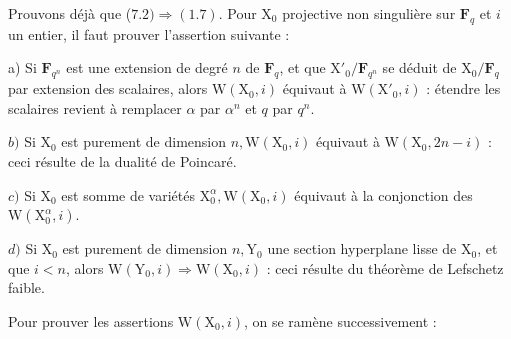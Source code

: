 \documentclass[10pt,leqno]{article}
\begin{document}
\clearpage

\endgroup

\label{physical-30}\par\smallskip

\noindent Prouvons déjà que (\(7.2)\Rightarrow (1.7)\). Pour \(\mathrm{X}_{0}\) projective non singulière sur \(\mathbf{F}_{q}\) et \(i\) un entier, il faut prouver l’assertion suivante :\par

\par

\noindent a) Si \(\mathbf{F}_{q^{n}}\) est une extension de degré \(n\) de \(\mathbf{F}_{q}\), et que \(\mathrm{X}'_{0}/\mathbf{F}_{q^{n}}\) se déduit de \(\mathrm{X}_{0}/\mathbf{F}_{q}\) par extension des scalaires, alors \(\mathrm{W}(\mathrm{X}_{0},i)\) équivaut à \(\mathrm{W}(\mathrm{X}'_{0},i)\) : étendre les scalaires revient à remplacer \(\alpha \) par \(\alpha ^{n}\) et \(q\) par \(q^{n}\).\par

\noindent \(b)\) Si \(\mathrm{X}_{0}\) est purement de dimension \(n, \mathrm{W}(\mathrm{X}_{0},i)\) équivaut à \(\mathrm{W}(\mathrm{X}_{0},2n- i)\) : ceci résulte de la dualité de Poincaré.\par

\noindent \(c)\) Si \(\mathrm{X}_{0}\) est somme de variétés \(\mathrm{X}_{0}^{\alpha }, \mathrm{W}(\mathrm{X}_{0},i)\) équivaut à la conjonction des \(\mathrm{W}(\mathrm{X}_{0}^{\alpha },i)\).\par

\noindent \(d)\) Si \(\mathrm{X}_{0}\) est purement de dimension \(n, \mathrm{Y}_{0}\) une section hyperplane lisse de \(\mathrm{X}_{0}\), et que \(i<n\), alors \(\mathrm{W}(\mathrm{Y}_{0},i)\Rightarrow \mathrm{W}(\mathrm{X}_{0},i)\) : ceci résulte du théorème de Lefschetz faible.\par

\noindent Pour prouver les assertions \(\mathrm{W}(\mathrm{X}_{0},i)\), on se ramène successivement :\par
\end{document}
